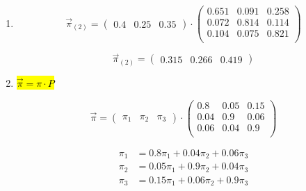 \documentclass{templateNote}
\begin{document}
\begin{center}
\begin{enumerate}[label=\alph*)]
        \item 
        \begin{equation*}
            \vec{\pi}_{(2)}= 
            \begin{pmatrix}
                0.4 & 0.25 & 0.35 
            \end{pmatrix}
            \cdot 
            \begin{pmatrix}
                0.651 & 0.091 & 0.258 \\
                0.072 & 0.814 & 0.114 \\
                0.104 & 0.075 & 0.821 \\
            \end{pmatrix}
        \end{equation*}

        \begin{equation*}
            \vec{\pi}_{(2)}= 
            \begin{pmatrix}
                0.315 & 0.266 & 0.419
            \end{pmatrix} 
        \end{equation*}

        \item \hl{$\vec{\pi} = \pi \cdot P$}

        \begin{equation*}
            \vec{\pi}= 
            \begin{pmatrix}
                \pi_1 & \pi_2 & \pi_3
            \end{pmatrix} 
            \cdot
            \begin{pmatrix}
                0.8 & 0.05 & 0.15 \\
                0.04 & 0.9 & 0.06 \\
                0.06 & 0.04 & 0.9 \\
            \end{pmatrix} 
        \end{equation*}
        
        \begin{align*}
            \pi_1 &= 0.8\pi_1 + 0.04\pi_2 + 0.06\pi_3 \\
            \pi_2 &= 0.05\pi_1 + 0.9\pi_2 + 0.04\pi_3 \\
            \pi_3 &= 0.15\pi_1 + 0.06\pi_2 + 0.9\pi_3 \\
        \end{align*}
        
        

\end{enumerate}
\end{center}
\end{document}
